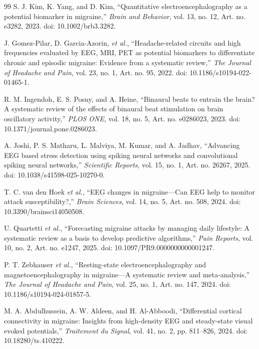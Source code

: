 \documentclass[12pt, a4paper]{report}
\begin{document}
\begin{thebibliography}{99}
S. J. Kim, K. Yang, and D. Kim, ``Quantitative electroencephalography as a potential biomarker in migraine,'' \textit{Brain and Behavior}, vol. 13, no. 12, Art. no. e3282, 2023. doi: 10.1002/brb3.3282.

J. Gomez-Pilar, D. Garcia-Azorin, \textit{et al.}, ``Headache-related circuits and high frequencies evaluated by EEG, MRI, PET as potential biomarkers to differentiate chronic and episodic migraine: Evidence from a systematic review,'' \textit{The Journal of Headache and Pain}, vol. 23, no. 1, Art. no. 95, 2022. doi: 10.1186/s10194-022-01465-1.

R. M. Ingendoh, E. S. Posny, and A. Heine, ``Binaural beats to entrain the brain? A systematic review of the effects of binaural beat stimulation on brain oscillatory activity,'' \textit{PLOS ONE}, vol. 18, no. 5, Art. no. e0286023, 2023. doi: 10.1371/journal.pone.0286023.

A. Joshi, P. S. Matharu, L. Malviya, M. Kumar, and A. Jadhav, ``Advancing EEG based stress detection using spiking neural networks and convolutional spiking neural networks,'' \textit{Scientific Reports}, vol. 15, no. 1, Art. no. 26267, 2025. doi: 10.1038/s41598-025-10270-0.

T. C. van den Hoek \textit{et al.}, ``EEG changes in migraine---Can EEG help to monitor attack susceptibility?,'' \textit{Brain Sciences}, vol. 14, no. 5, Art. no. 508, 2024. doi: 10.3390/brainsci14050508.

U. Quartetti \textit{et al.}, ``Forecasting migraine attacks by managing daily lifestyle: A systematic review as a basis to develop predictive algorithms,'' \textit{Pain Reports}, vol. 10, no. 2, Art. no. e1247, 2025. doi: 10.1097/PR9.0000000000001247.

P. T. Zebhauser \textit{et al.}, ``Resting-state electroencephalography and magnetoencephalography in migraine---A systematic review and meta-analysis,'' \textit{The Journal of Headache and Pain}, vol. 25, no. 1, Art. no. 147, 2024. doi: 10.1186/s10194-024-01857-5.

M. A. Abdulhussein, A. W. Aldeen, and H. Al-Abboodi, ``Differential cortical connectivity in migraine: Insights from high-density EEG and steady-state visual evoked potentials,'' \textit{Traitement du Signal}, vol. 41, no. 2, pp. 811--826, 2024. doi: 10.18280/ts.410222.


\end{thebibliography}
\end{document}
